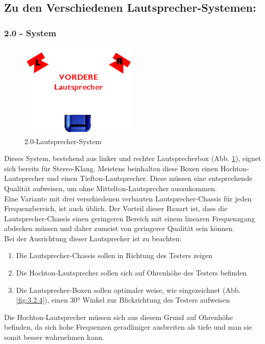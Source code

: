 \newpage
\subsection*{Zu den Verschiedenen Lautsprecher-Systemen:}
\subsubsection*{2.0 - System}
\begin{figure} [H]
	\centering
	\includegraphics[width=0.5\textwidth]{img/Grundlagen/Mehrweg-Lautsprechersysteme/DOLBYDigital20-cut.jpg}
	\caption{2.0-Lautsprecher-System}
	\label{fig:3.2.3}
\end{figure}

Dieses System, bestehend aus linker und rechter Lautsprecherbox (Abb. \ref{fig:3.2.3}), eignet sich bereits für Stereo-Klang.
Meistens beinhalten diese Boxen einen Hochton-Lautsprecher und einen Tiefton-Lautsprecher.
Diese müssen eine entsprechende Qualität aufweisen, um ohne Mittelton-Lautsprecher auszukommen.\\
Eine Variante mit drei verschiedenen verbauten Lautsprecher-Chassis für jeden Frequenzbereich, ist auch üblich.
Der Vorteil dieser Bauart ist, dass die Lautsprecher-Chassis einen geringeren Bereich mit einem linearen Frequenzgang abdecken müssen und daher zumeist von geringerer Qualität sein können.\\
Bei der Ausrichtung dieser Lautsprecher ist zu beachten:
\begin{enumerate}
	\item Die Lautsprecher-Chassis sollen in Richtung des Testers zeigen
	\item Die Hochton-Lautsprecher sollen sich auf Ohrenhöhe des Testers befinden
	\item Die Lautsprecher-Boxen sollen optimaler weise, wie eingezeichnet (Abb. \ref{fig:3.2.4}), einen 30° Winkel zur Blickrichtung des Testers aufweisen
\end{enumerate}
Die Hochton-Lautsprecher müssen sich aus diesem Grund auf Ohrenhöhe befinden, da sich hohe Frequenzen geradliniger ausbreiten als tiefe und man sie somit besser wahrnehmen kann.

